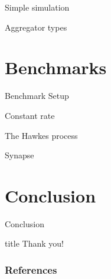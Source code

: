 \documentclass[
  ignorenonframetext,
  aspectratio=169
]{beamer}
\begin{document}
\begin{frame}{Simple simulation}
\end{frame}

\begin{frame}{Aggregator types}
\end{frame}

\hypertarget{benchmarks}{%
\section{Benchmarks}\label{benchmarks}}

\begin{frame}{Benchmark Setup}
\end{frame}

\begin{frame}{Constant rate}
\end{frame}

\begin{frame}{The Hawkes process}
\end{frame}

\begin{frame}{Synapse}
\end{frame}

\hypertarget{conclusion}{%
\section{Conclusion}\label{conclusion}}

\begin{frame}{Conclusion}
\end{frame}

\begin{frame}
  \thispagestyle{empty@titlepage}
  \begingroup
    \begin{beamercolorbox}[sep=8pt,center]{title}%
      {Thank you!}%
    \end{beamercolorbox}
  \endgroup
\end{frame}

\begin{frame}[t,allowframebreaks]
  \frametitle{References}
  \printbibliography[heading=none]
\end{frame}
\end{document}

